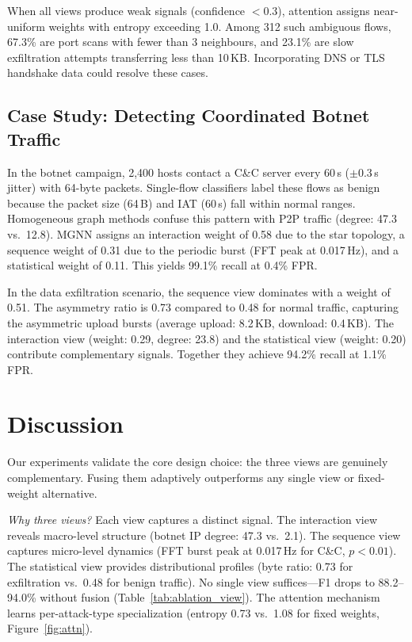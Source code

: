 \documentclass[conference]{IEEEtran}
\begin{document}
When all views produce weak signals (confidence $<0.3$), attention assigns near-uniform weights with entropy exceeding 1.0. Among 312 such ambiguous flows, 67.3\% are port scans with fewer than 3 neighbours, and 23.1\% are slow exfiltration attempts transferring less than 10\,KB. Incorporating DNS or TLS handshake data could resolve these cases.

\subsection{Case Study: Detecting Coordinated Botnet Traffic}
\label{sec:case}

In the botnet campaign, 2,400 hosts contact a C\&C server every 60\,s ($\pm$0.3\,s jitter) with 64-byte packets. Single-flow classifiers label these flows as benign because the packet size (64\,B) and IAT (60\,s) fall within normal ranges. Homogeneous graph methods confuse this pattern with P2P traffic (degree: 47.3 vs.\ 12.8). MGNN assigns an interaction weight of 0.58 due to the star topology, a sequence weight of 0.31 due to the periodic burst (FFT peak at 0.017\,Hz), and a statistical weight of 0.11. This yields 99.1\% recall at 0.4\% FPR.

In the data exfiltration scenario, the sequence view dominates with a weight of 0.51. The asymmetry ratio is 0.73 compared to 0.48 for normal traffic, capturing the asymmetric upload bursts (average upload: 8.2\,KB, download: 0.4\,KB). The interaction view (weight: 0.29, degree: 23.8) and the statistical view (weight: 0.20) contribute complementary signals. Together they achieve 94.2\% recall at 1.1\% FPR.


\section{Discussion}

Our experiments validate the core design choice: the three views are genuinely complementary. Fusing them adaptively outperforms any single view or fixed-weight alternative.

\textit{Why three views?} Each view captures a distinct signal. The interaction view reveals macro-level structure (botnet IP degree: 47.3 vs.\ 2.1). The sequence view captures micro-level dynamics (FFT burst peak at 0.017\,Hz for C\&C, $p<0.01$). The statistical view provides distributional profiles (byte ratio: 0.73 for exfiltration vs.\ 0.48 for benign traffic). No single view suffices---F1 drops to 88.2--94.0\% without fusion (Table~\ref{tab:ablation_view}). The attention mechanism learns per-attack-type specialization (entropy 0.73 vs.\ 1.08 for fixed weights, Figure~\ref{fig:attn}).
\end{document}
